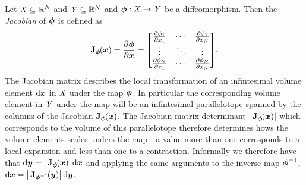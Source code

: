 Let $\mathit{X} \subseteq \mathbb{R}^N$ and $\mathit{Y} \subseteq \mathbb{R}^N$ and $\boldsymbol{\phi} : \mathit{X} \to \mathit{Y}$ be a diffeomorphism. Then the \emph{Jacobian} of $\boldsymbol{\phi}$ is defined as
\begin{equation}
  \jacob{\vct{\phi}}{\vct{x}} = \pd{\vct{\phi}}{\vct{x}} =
  \begin{bmatrix}
    \pd{\phi_1}{x_1} & \cdots & \pd{\phi_1}{x_N}\\
    \vdots & \ddots & \vdots \\
    \pd{\phi_N}{x_1} & \cdots & \pd{\phi_N}{x_N}
  \end{bmatrix}.
\end{equation}
The Jacobian matrix describes the local transformation of an infintesimal volume element $\mathrm{d}\boldsymbol{x}$ in $\mathit{X}$ under the map $\boldsymbol{\phi}$. In particular the corresponding volume element in $\mathit{Y}$ under the map will be an infintesimal parallelotope spanned by the columns of the Jacobian $\jacob{\vct{\phi}}{\vct{x}}$. The Jacobian matrix determinant $\left|\,\jacob{\vct{\phi}}{\vct{x}}\right|$ which corresponds to the volume of this parallelotope therefore determines hows the volume elements scales unders the map - a value more than one corresponds to a local expansion and less than one to a contraction. Informally we therefore have that $\dr\vct{y} = \left|\,\jacob{\vct{\phi}}{\vct{x}}\right|\,\dr\vct{x}$ and applying the same arguments to the inverse map $\boldsymbol{\phi}^{-1}$, $\dr\vct{x} = \left|\,\jacob{\vct{\phi}^{-1}}{\vct{y}}\right|\,\dr\vct{y}$.

